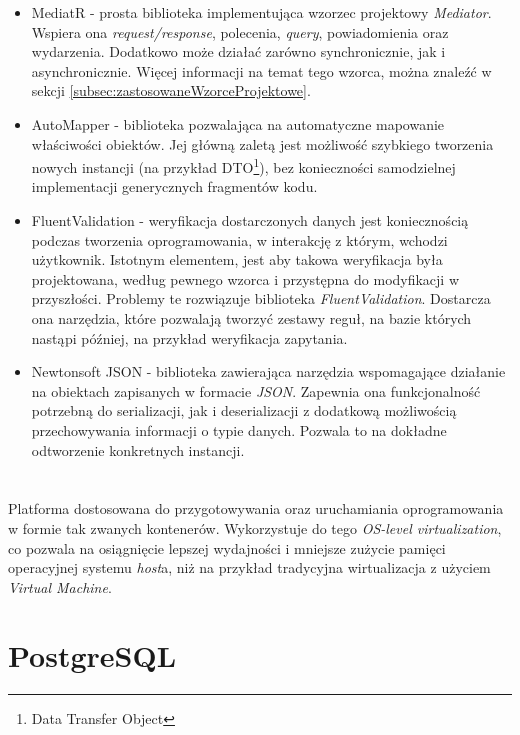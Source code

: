 \begin{itemize}
	\item MediatR - prosta biblioteka implementująca wzorzec projektowy \emph{Mediator}. Wspiera ona \emph{request/response}, polecenia, \emph{query}, powiadomienia oraz wydarzenia. Dodatkowo może działać zarówno synchronicznie, jak i asynchronicznie. Więcej informacji na temat tego wzorca, można znaleźć w sekcji \ref{subsec:zastosowaneWzorceProjektowe}.
	\item AutoMapper - biblioteka pozwalająca na automatyczne mapowanie właściwości obiektów. Jej główną zaletą jest możliwość szybkiego tworzenia nowych instancji (na przykład DTO\footnote{Data Transfer Object}), bez konieczności samodzielnej implementacji generycznych fragmentów kodu.
	\item FluentValidation - weryfikacja dostarczonych danych jest koniecznością podczas tworzenia oprogramowania, w interakcję z którym, wchodzi użytkownik. Istotnym elementem, jest aby takowa weryfikacja była projektowana, według pewnego wzorca i przystępna do modyfikacji w przyszłości. Problemy te rozwiązuje biblioteka \emph{FluentValidation}. Dostarcza ona narzędzia, które pozwalają tworzyć zestawy reguł, na bazie których nastąpi później, na przykład weryfikacja zapytania.
	\item Newtonsoft JSON - biblioteka zawierająca narzędzia wspomagające działanie na obiektach zapisanych w formacie \emph{JSON}. Zapewnia ona funkcjonalność potrzebną do serializacji, jak i deserializacji z dodatkową możliwością przechowywania informacji o typie danych. Pozwala to na dokładne odtworzenie konkretnych instancji.
\end{itemize}

\section{\docker}

\par Platforma dostosowana do przygotowywania oraz uruchamiania oprogramowania w formie tak zwanych kontenerów. Wykorzystuje do tego \emph{OS-level virtualization}, co pozwala na osiągnięcie lepszej wydajności i mniejsze zużycie pamięci operacyjnej systemu \emph{host}a, niż na przykład tradycyjna wirtualizacja z użyciem \emph{Virtual Machine}.

\section{PostgreSQL}

